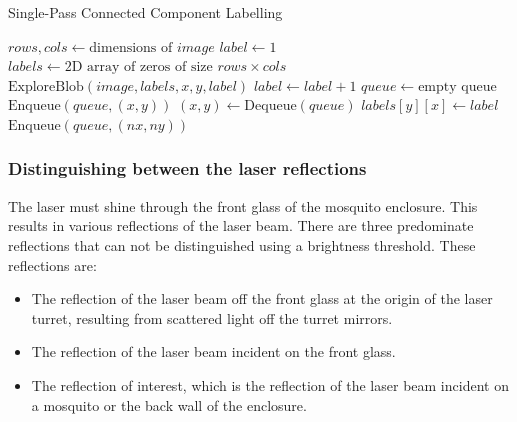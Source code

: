 \begin{algorithm}[h]
    \caption{Single-Pass Connected Component Labelling}
    \label{alg:single_pass_ccl}
    \begin{algorithmic}[1]
        \State $rows, cols \gets \text{dimensions of } image$
        \State $label \gets 1$
        \State $labels \gets \text{2D array of zeros of size } rows \times cols$
        \State $\text{ExploreBlob}(image, labels, x, y, label)$
        \State $label \gets label + 1$
        \EndIf
        \EndFor
        \EndFor
        \EndProcedure
        \State
        \State $queue \gets \text{empty queue}$
        \State $\text{Enqueue}(queue, (x, y))$
        \State $(x, y) \gets \text{Dequeue}(queue)$
        \State {}
        \EndIf
        \State $labels[y][x] \gets label$
        \State $\text{Enqueue}(queue, (nx, ny))$
        \EndFor
        \EndWhile
        \EndProcedure
    \end{algorithmic}
\end{algorithm}



\subsubsection{Distinguishing between the laser reflections}
The laser must shine through the front glass of the mosquito enclosure. This results in various reflections of the laser beam. There are three predominate reflections that can not be distinguished using a brightness threshold. These reflections are:
\begin{itemize}
    \item The reflection of the laser beam off the front glass at the origin of the laser turret, resulting from scattered light off the turret mirrors.
    \item The reflection of the laser beam incident on the front glass.
    \item The reflection of interest, which is the reflection of the laser beam incident on a mosquito or the back wall of the enclosure.
\end{itemize}


